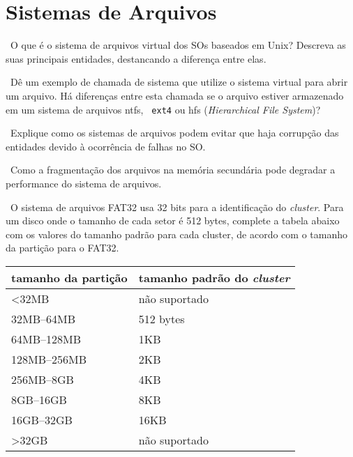 \maketitle
\section*{Sistemas de Arquivos}

\exercise~O que é o sistema de arquivos virtual dos SOs baseados em
{\sc Unix}?  Descreva as suas principais entidades, destancando a
diferença entre elas.

\exercise~Dê um exemplo de chamada de sistema que utilize o sistema
virtual para abrir um arquivo. Há diferenças entre esta chamada se o
arquivo estiver armazenado em um sistema de arquivos {\sc ntfs}, {\tt
  ext4} ou {\sc hfs} ({\em Hierarchical File System})?

\exercise~Explique como os sistemas de arquivos podem evitar que haja 
corrupção das entidades devido à ocorrência de falhas no SO.

\exercise~Como a fragmentação dos arquivos na memória secundária pode
degradar a performance do sistema de arquivos.

\exercise~O sistema de arquivos FAT32 usa 32 bits para a identificação
do {\em cluster}. Para um disco onde o tamanho de cada setor é 512
bytes, complete a tabela abaixo com os valores do tamanho padrão para
cada cluster, de acordo com o tamanho da partição para o FAT32.

\begin{center}
  \begin{tabular}[ht]{l|l}\hline
    \bf tamanho da partição & \bf tamanho padrão do {\em cluster} \\\hline
    <32MB & não suportado\\\hline
    32MB--64MB & 512 bytes\\\hline
    64MB--128MB & 1KB\\\hline
    128MB--256MB & 2KB\\\hline
    256MB--8GB & 4KB\\\hline
    8GB--16GB & 8KB\\\hline
    16GB--32GB & 16KB\\\hline
    >32GB & não suportado \\\hline
  \end{tabular}
\end{center}
\def\VFS{
\question[5,0] Responda às seguintes questões baseadas no sistemas de arquivos virtual:

\begin{enumerate}[a)]
\item O que é o sistema de arquivos virtual dos SOs baseados em {\sc
    Unix}?
\item Descreva as suas principais entidades, destancando a diferença
  entre elas.
\item Dê um exemplo de chamada de sistema que utilize o sistema
  virtual para abrir um arquivo.
\item Há diferenças entre esta chamada se o arquivo estiver armazenado
  em um sistema de arquivos {\sc ntfs}, {\tt ext4} ou {\sc hfs} ({\em
    Hierarchical File System})?
\end{enumerate}
}
